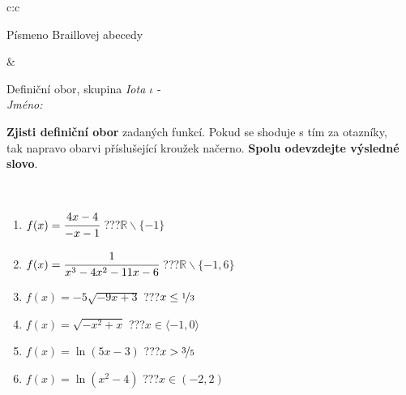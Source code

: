 \documentclass[10pt]{report}
\begin{document}
\begin{tabular}{c:c}
\begin{minipage}[c][104.5mm][t]{0.5\linewidth}
\begin{center}
\begin{minipage}{0.20\linewidth}
\begin{center}
{\small Písmeno Braillovej abecedy}
\end{center}
\end{minipage}
\end{center}
\end{minipage}
&
\begin{minipage}[c][104.5mm][t]{0.5\linewidth}
\begin{center}
\vspace{7mm}
{\huge Definiční obor, skupina \textit{Iota $\iota$} -}\\[5mm]
\textit{Jméno:}\phantom{xxxxxxxxxxxxxxxxxxxxxxxxxxxxxxxxxxxxxxxxxxxxxxxxxxxxxxxxxxxxxxxxx}\\[5mm]
\begin{minipage}{0.95\linewidth}
\begin{center}
\textbf{Zjisti definiční obor} zadaných funkcí. Pokud se shoduje s tím za otazníky,\\tak napravo obarvi příslušející kroužek načerno. \textbf{Spolu odevzdejte výsledné slovo}.
\end{center}
\end{minipage}
\\[1mm]
\begin{minipage}{0.79\linewidth}
\begin{center}
\begin{varwidth}{\linewidth}
\begin{enumerate}
\normalsizerrr
\item $f(x)=\cfrac{4x-4}{-x-1}$\quad \dotfill\; ???\;\dotfill \quad $\mathbb{R}\smallsetminus\{-1\}$
\item $f(x)=\cfrac{1}{x^3-4x^2-11x-6}$\quad \dotfill\; ???\;\dotfill \quad $\mathbb{R}\smallsetminus\{-1,6\}$
\item $f(x)=-5\sqrt{-9x+3}$\quad \dotfill\; ???\;\dotfill \quad $x\leq\nicefrac{1}{3}$
\item $f(x)=\sqrt{-x^2+x}$\quad \dotfill\; ???\;\dotfill \quad $x\in\langle-1 , 0\rangle$
\item $f(x)=\ln{(5x-3)}$\quad \dotfill\; ???\;\dotfill \quad $x>\nicefrac{3}{5}$
\item $f(x)=\ln{(x^2-4)}$\quad \dotfill\; ???\;\dotfill \quad $x\in(-2 , 2)$
\end{enumerate}
\end{varwidth}
\end{center}
\end{minipage}
\begin{minipage}{0.20\linewidth}
\begin{center}

\end{center}
\end{minipage}
\end{center}
\end{minipage}
\end{tabular}
\end{document}
